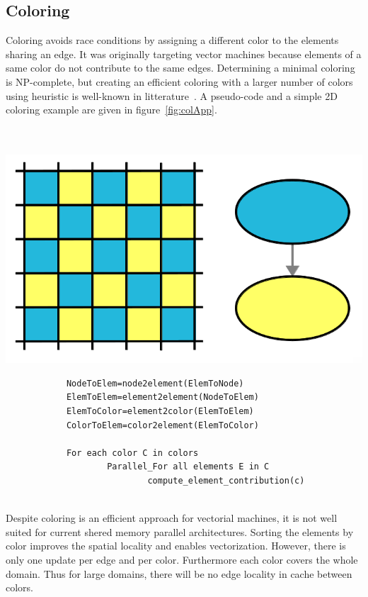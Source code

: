\documentclass{IOS-Book-Article}
\begin{document}
\subsection{Coloring}
\label{sec:col}
Coloring avoids race conditions by assigning a different color to the elements sharing an edge.
It was originally targeting vector machines because elements of a same color do not contribute to the same edges.
Determining a minimal coloring is NP-complete, but creating an efficient coloring with a larger number of colors using heuristic is well-known in litterature~\cite{findsomeonetocite}.
A pseudo-code and a simple 2D coloring example are given in figure~\ref{fig:colApp}.
~\\~\\~\\
{
\begin{minipage}[tp]{0.34\textwidth}
	\includegraphics[scale=0.15]{Coloring_approach.png}
\end{minipage}
\begin{minipage}[tp]{0.55\textwidth}
 		\small
 		\begin{verbatim}
			NodeToElem=node2element(ElemToNode)
			ElemToElem=element2element(NodeToElem)
			ElemToColor=element2color(ElemToElem)
			ColorToElem=color2element(ElemToColor)

			For each color C in colors
    				Parallel_For all elements E in C
        					compute_element_contribution(c)
 		\end{verbatim}
 \end{minipage}	
 }
 ~\\
Despite coloring is an efficient approach for vectorial machines, it is not well suited for current shered memory parallel architectures.
Sorting the elements by color improves the spatial locality and enables vectorization.
However, there is only one update per edge and per color. Furthermore each color covers the whole domain.
Thus for large domains, there will be no edge locality in cache between colors.
\end{document}
